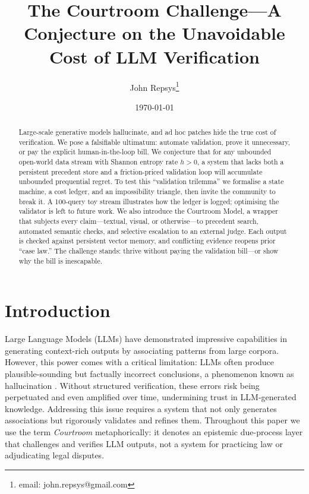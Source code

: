 \documentclass[11pt]{article}
\title{The Courtroom Challenge—A Conjecture on the Unavoidable Cost of LLM Verification}
\author{John Repsys\thanks{email: john.repsys@gmail.com}}
\date{\today}
\begin{document}
\maketitle
\begin{abstract}
Large-scale generative models hallucinate, and ad hoc patches hide the true cost of verification. We pose a falsifiable ultimatum: automate validation, prove it unnecessary, or pay the explicit human-in-the-loop bill. We conjecture that for any unbounded open-world data stream with Shannon entropy rate $h>0$, a system that lacks both a persistent precedent store and a friction-priced validation loop will accumulate unbounded prequential regret. To test this “validation trilemma” we formalise a state machine, a cost ledger, and an impossibility triangle, then invite the community to break it. A 100-query toy stream illustrates how the ledger is logged; optimising the validator is left to future work. We also introduce the Courtroom Model, a wrapper that subjects every claim—textual, visual, or otherwise—to precedent search, automated semantic checks, and selective escalation to an external judge. Each output is checked against persistent vector memory, and conflicting evidence reopens prior “case law.” The challenge stands: thrive without paying the validation bill—or show why the bill is inescapable.
\end{abstract}



\section{Introduction}
\label{sec:intro}
Large Language Models (LLMs) have demonstrated impressive capabilities in generating context-rich outputs by associating patterns from large corpora. However, this power comes with a critical limitation: LLMs often produce plausible-sounding but factually incorrect conclusions, a phenomenon known as hallucination \citep{marcus2020nextdecade,shinn2023reflexion}. Without structured verification, these errors risk being perpetuated and even amplified over time, undermining trust in LLM-generated knowledge. Addressing this issue requires a system that not only generates associations but rigorously validates and refines them.
Throughout this paper we use the term
\emph{Courtroom} metaphorically: it denotes an epistemic due-process layer that challenges and verifies LLM outputs, not a system for practicing law or adjudicating legal disputes.
\end{document}

